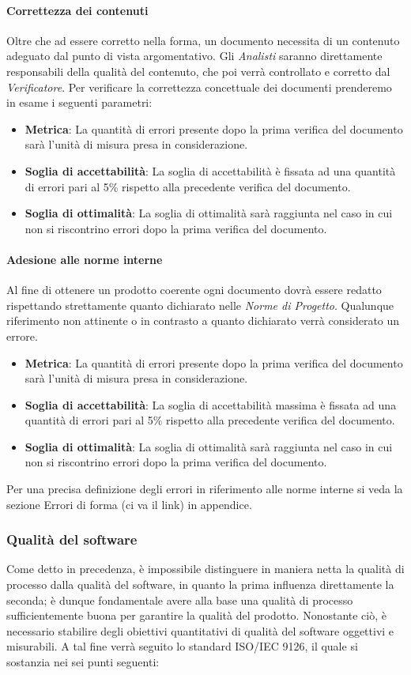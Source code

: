 \paragraph{Correttezza dei contenuti}
Oltre che ad essere corretto nella forma, un documento necessita di un contenuto adeguato dal punto di vista argomentativo. Gli \emph{Analisti} saranno direttamente responsabili della qualità del contenuto, che poi verrà controllato e corretto dal \emph{Verificatore}.
Per verificare la correttezza concettuale dei documenti prenderemo in esame i seguenti parametri:
\begin{itemize}
	\item \textbf{Metrica}: La quantità di errori presente dopo la prima verifica del documento sarà l'unità di misura presa in considerazione.
	\item \textbf{Soglia di accettabilità}: La soglia di accettabilità è fissata ad una quantità di errori pari al 5\% rispetto alla precedente verifica del documento.
	\item \textbf{Soglia di ottimalità}: La soglia di ottimalità sarà raggiunta nel caso in cui non si riscontrino errori dopo la prima verifica del documento.
\end{itemize}
\paragraph{Adesione alle norme interne}
Al fine di ottenere un prodotto coerente ogni documento dovrà essere redatto rispettando strettamente quanto dichiarato nelle \emph{Norme di Progetto}.
Qualunque riferimento non attinente o in contrasto a quanto dichiarato verrà considerato un errore.
\begin{itemize}
	\item \textbf{Metrica}: La quantità di errori presente dopo la prima verifica del documento sarà l'unità di misura presa in considerazione. 
	\item \textbf{Soglia di accettabilità}: La soglia di accettabilità massima è fissata ad una quantità di errori pari al 5\% rispetto alla precedente verifica del documento.
	\item \textbf{Soglia di ottimalità}: La soglia di ottimalità sarà raggiunta nel caso in cui non si riscontrino errori dopo la prima verifica del documento.
\end{itemize}
Per una precisa definizione degli errori in riferimento alle norme interne si veda la sezione Errori di forma (ci va il link) in appendice.

\subsubsection{Qualità del software}
Come detto in precedenza, è impossibile distinguere in maniera netta la qualità di processo dalla qualità del software, in quanto la prima influenza direttamente la seconda; è dunque fondamentale avere alla base una qualità di processo sufficientemente buona per garantire la qualità del prodotto. Nonostante ciò, è necessario stabilire degli obiettivi quantitativi di qualità del software oggettivi e misurabili. A tal fine verrà seguito lo standard ISO/IEC 9126, il quale si sostanzia nei sei punti seguenti:

